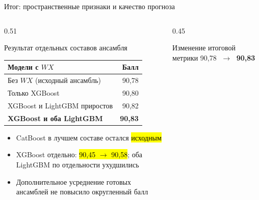 \begin{frame}[t]{Итог: пространственные признаки и качество прогноза}
  \VladimirText
  \par
  
  \begin{columns}[T,onlytextwidth]
    \begin{column}{0.51\textwidth}
      \begin{block}{Результат отдельных составов ансамбля}
        \VladimirText
        \setlength{\tabcolsep}{4pt}
        \renewcommand{\arraystretch}{1.15}
        \begin{tabular*}{\linewidth}{@{\extracolsep{\fill}}lr@{}}
          \toprule
          \textbf{Модели с $WX$} & \textbf{Балл} \\
          \midrule
          Без $WX$ (исходный ансамбль) & 90,78 \\
          Только XGBoost & 90,80 \\
          XGBoost и LightGBM приростов & 90,82 \\
          \rowcolor{hselight}
          \textbf{XGBoost и оба LightGBM} & \textbf{\color{posgreen}90,83} \\
          \bottomrule
        \end{tabular*}
      \end{block}
      
      \begin{itemize}\VladimirText
        \setlength{\itemsep}{0.55ex}
        \item CatBoost в лучшем составе остался \hl{исходным}
        \item XGBoost отдельно: \hl{90,45 $\rightarrow$ 90,58}; оба LightGBM по отдельности ухудшились
        \item Дополнительное усреднение готовых ансамблей не повысило округленный балл
      \end{itemize}
    \end{column}
    \begin{column}{0.45\textwidth}
      \begin{block}{Изменение итоговой метрики}
        \centering
        {\Large\color{hsegray}90,78}
        {\Large\color{hseblue}$\;\longrightarrow\;$}
        {\LARGE\bfseries\color{posgreen}90,83}\par
        

\end{block}
\end{column}
\end{columns}
\end{frame}
